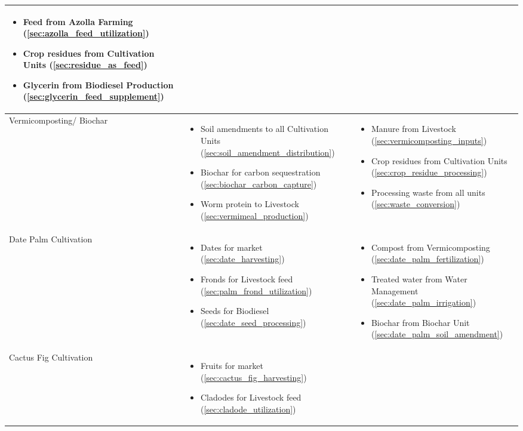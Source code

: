 \begin{table}[h]
\begin{tabular}{|p{2.5cm}|p{5cm}|p{5cm}|}
\begin{itemize}
    \item Feed from Azolla Farming (\ref{sec:azolla_feed_utilization})
    \item Crop residues from Cultivation Units (\ref{sec:residue_as_feed})
    \item Glycerin from Biodiesel Production (\ref{sec:glycerin_feed_supplement})
\end{itemize} \\
\hline
Vermicomposting/ Biochar & 
\begin{itemize}
    \item Soil amendments to all Cultivation Units (\ref{sec:soil_amendment_distribution})
    \item Biochar for carbon sequestration (\ref{sec:biochar_carbon_capture})
    \item Worm protein to Livestock (\ref{sec:vermimeal_production})
\end{itemize} & 
\begin{itemize}
    \item Manure from Livestock (\ref{sec:vermicomposting_inputs})
    \item Crop residues from Cultivation Units (\ref{sec:crop_residue_processing})
    \item Processing waste from all units (\ref{sec:waste_conversion})
\end{itemize} \\
\hline
Date Palm Cultivation & 
\begin{itemize}
    \item Dates for market (\ref{sec:date_harvesting})
    \item Fronds for Livestock feed (\ref{sec:palm_frond_utilization})
    \item Seeds for Biodiesel (\ref{sec:date_seed_processing})
\end{itemize} & 
\begin{itemize}
    \item Compost from Vermicomposting (\ref{sec:date_palm_fertilization})
    \item Treated water from Water Management (\ref{sec:date_palm_irrigation})
    \item Biochar from Biochar Unit (\ref{sec:date_palm_soil_amendment})
\end{itemize} \\
\hline
Cactus Fig Cultivation & 
\begin{itemize}
    \item Fruits for market (\ref{sec:cactus_fig_harvesting})
    \item Cladodes for Livestock feed (\ref{sec:cladode_utilization})

\end{itemize}
\end{tabular}
\end{table}
